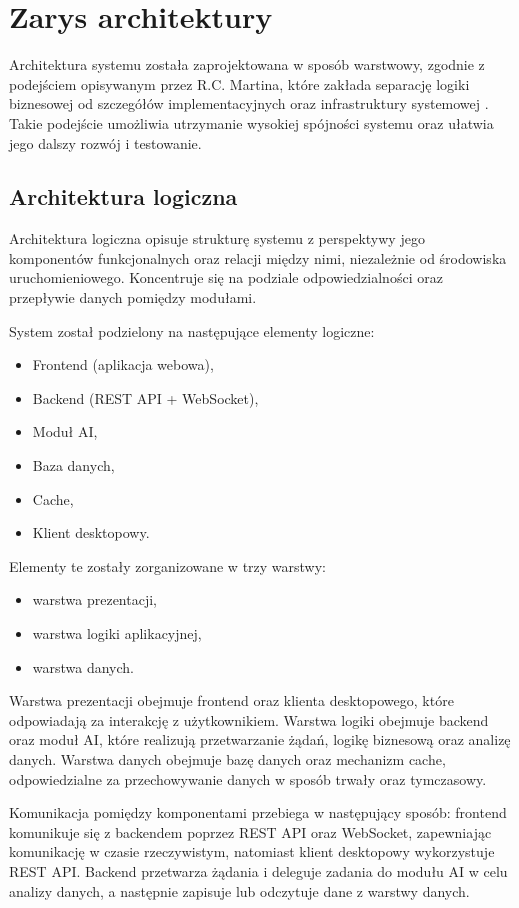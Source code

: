 \section{Zarys architektury}

Architektura systemu została zaprojektowana w sposób warstwowy, zgodnie z podejściem opisywanym przez R.C. Martina, które zakłada separację logiki biznesowej od szczegółów implementacyjnych oraz infrastruktury systemowej \cite{2}. Takie podejście umożliwia utrzymanie wysokiej spójności systemu oraz ułatwia jego dalszy rozwój i testowanie.

\subsection{Architektura logiczna}

Architektura logiczna opisuje strukturę systemu z perspektywy jego komponentów funkcjonalnych oraz relacji między nimi, niezależnie od środowiska uruchomieniowego. Koncentruje się na podziale odpowiedzialności oraz przepływie danych pomiędzy modułami.

System został podzielony na następujące elementy logiczne:
\begin{itemize}
	\item Frontend (aplikacja webowa),
	\item Backend (REST API + WebSocket),
	\item Moduł AI,
	\item Baza danych,
	\item Cache,
	\item Klient desktopowy.
\end{itemize}

Elementy te zostały zorganizowane w trzy warstwy:
\begin{itemize}
	\item warstwa prezentacji,
	\item warstwa logiki aplikacyjnej,
	\item warstwa danych.
\end{itemize}

Warstwa prezentacji obejmuje frontend oraz klienta desktopowego, które odpowiadają za interakcję z użytkownikiem. Warstwa logiki obejmuje backend oraz moduł AI, które realizują przetwarzanie żądań, logikę biznesową oraz analizę danych. Warstwa danych obejmuje bazę danych oraz mechanizm cache, odpowiedzialne za przechowywanie danych w sposób trwały oraz tymczasowy.

Komunikacja pomiędzy komponentami przebiega w następujący sposób:
frontend komunikuje się z backendem poprzez REST API oraz WebSocket, zapewniając komunikację w czasie rzeczywistym, natomiast klient desktopowy wykorzystuje REST API. Backend przetwarza żądania i deleguje zadania do modułu AI w celu analizy danych, a następnie zapisuje lub odczytuje dane z warstwy danych.

